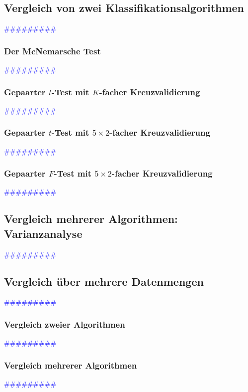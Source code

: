 \documentclass{article}
\begin{document}
  \subsection{Vergleich von zwei Klassifikationsalgorithmen} %
       \textcolor{blue}{\#\#\#\#\#\#\#\#\#}
    \subsubsection{Der McNemarsche Test} %
       \textcolor{blue}{\#\#\#\#\#\#\#\#\#}
    \subsubsection{Gepaarter $t$-Test mit $K$-facher Kreuzvalidierung} %
       \textcolor{blue}{\#\#\#\#\#\#\#\#\#}
    \subsubsection{Gepaarter $t$-Test mit $5 \times 2$-facher Kreuzvalidierung} %
       \textcolor{blue}{\#\#\#\#\#\#\#\#\#}
    \subsubsection{Gepaarter $F$-Test mit $5 \times 2$-facher Kreuzvalidierung} %
       \textcolor{blue}{\#\#\#\#\#\#\#\#\#}
  \subsection{Vergleich mehrerer Algorithmen: Varianzanalyse} %
       \textcolor{blue}{\#\#\#\#\#\#\#\#\#}
  \subsection{Vergleich über mehrere Datenmengen} %
       \textcolor{blue}{\#\#\#\#\#\#\#\#\#}
    \subsubsection{Vergleich zweier Algorithmen} %
       \textcolor{blue}{\#\#\#\#\#\#\#\#\#}
    \subsubsection{Vergleich mehrerer Algorithmen} %
       \textcolor{blue}{\#\#\#\#\#\#\#\#\#}
\end{document}
